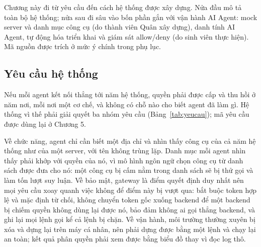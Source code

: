 \documentclass[a4paper]{article}
\begin{document}
Chương này đi từ yêu cầu đến cách hệ thống được xây dựng. Nửa đầu mô tả toàn bộ hệ thống; nửa sau đi sâu vào bốn phần gắn với vận hành AI Agent: mock server và danh mục công cụ (do thành viên Quân xây dựng), danh tính AI Agent, tự động hóa triển khai và giám sát allow/deny (do sinh viên thực hiện). Mã nguồn được trích ở mức ý chính trong phụ lục.

\subsection{Yêu cầu hệ thống}

Nếu mỗi agent kết nối thẳng tới năm hệ thống, quyền phải được cấp và thu hồi ở năm nơi, mỗi nơi một cơ chế, và không có chỗ nào cho biết agent đã làm gì. Hệ thống vì thế phải giải quyết ba nhóm yêu cầu (Bảng~\ref{tab:yeucau}); mã yêu cầu được dùng lại ở Chương 5.

Về chức năng, agent chỉ cần biết một địa chỉ và nhìn thấy công cụ của cả năm hệ thống như của một server, với tên không trùng lặp. Danh mục mỗi agent nhìn thấy phải khớp với quyền của nó, vì mô hình ngôn ngữ chọn công cụ từ danh sách được đưa cho nó: một công cụ bị cấm nằm trong danh sách sẽ bị thử gọi và làm tốn lượt suy luận. Về bảo mật, gateway là điểm quyết định duy nhất nên mọi yêu cầu xoay quanh việc không để điểm này bị vượt qua: bắt buộc token hợp lệ và mặc định từ chối, không chuyển token gốc xuống backend để một backend bị chiếm quyền không dùng lại được nó, bảo đảm không ai gọi thẳng backend, và ghi lại mọi lệnh gọi kể cả lệnh bị chặn. Về vận hành, môi trường thường xuyên bị xóa và dựng lại trên máy cá nhân, nên phải dựng được bằng một lệnh và chạy lại an toàn; kết quả phân quyền phải xem được bằng biểu đồ thay vì đọc log thô.
\end{document}
